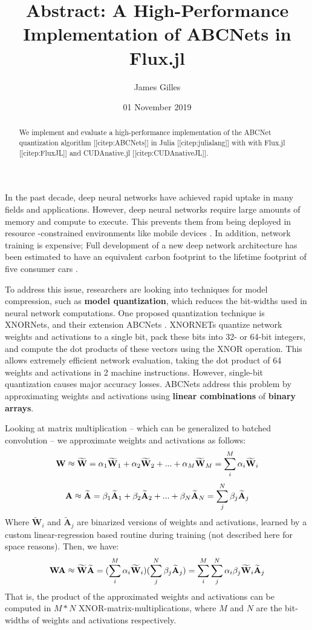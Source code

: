 \documentclass[11pt]{article}
\author{James Gilles}
\date{01 November 2019}
\title{Abstract: A High-Performance Implementation of ABCNets in Flux.jl}
\newcommand*{\Wv}[0]{\mathbf{W}}
\newcommand*{\Av}[0]{\mathbf{A}}
\newcommand*{\Wa}[0]{\widetilde{\mathbf{W}}}
\newcommand*{\Aa}[0]{\widetilde{\mathbf{A}}}
\newcommand*{\approxident}{%
\mathrel{\vcenter{\offinterlineskip
\hbox{$\sim$}\vskip-.35ex\hbox{$\sim$}}}}
\renewcommand*{\maketitle}[0]{}
\renewcommand*{\tableofcontents}[0]{}
\begin{document}
\maketitle
\tableofcontents

\begin{abstract}
We implement and evaluate a high-performance implementation of the ABCNet quantization algorithm [[citep:ABCNets]] in Julia [[citep:julialang]] with
with Flux.jl [[citep:FluxJL]] and CUDAnative.jl [[citep:CUDAnativeJL]].
\end{abstract}

In the past decade, deep neural networks have achieved rapid uptake in many fields
and applications. However, deep neural networks require large amounts
of memory and compute to execute. This prevents them from being deployed in resource
-constrained environments like mobile devices \citep{MobileNets}. In addition,
network training is expensive; Full
development of a new deep network architecture has been estimated to have an equivalent
carbon footprint to the lifetime footprint of five consumer cars \citep{EmitCarbon}.



To address this issue, researchers are looking into techniques for model compression,
such as \textbf{model quantization}, which reduces the bit-widths used in neural network
computations. One proposed quantization
technique is XNORNets, and their extension ABCNets \citep{XNORNets}\citep{ABCNets}.
XNORNETs quantize network weights and activations to a single
bit, pack these bits into 32- or 64-bit integers, and compute the dot products of
these vectors using the XNOR operation. This allows extremely efficient network
evaluation, taking the dot product of 64 weights and activations in 2
machine instructions. However, single-bit quantization causes major accuracy losses.
ABCNets address this problem by approximating weights and
activations using \textbf{linear combinations} of \textbf{binary arrays}.

Looking at matrix multiplication -- which can be generalized to batched convolution --
we approximate weights and activations as follows:
$$\Wv \approxident \Wa = \alpha_1 \Wa_1 + \alpha_2 \Wa_2 + ... + \alpha_M \Wa_M = \sum_i^M \alpha_i \Wa_i$$
$$\Av \approxident \Aa = \beta_1 \Aa_1 + \beta_2 \Aa_2 + ... + \beta_N \Aa_N = \sum_j^N \beta_j \Aa_j $$
Where \(\Wa_i\) and \(\Aa_j\) are binarized versions of weights and activations, learned by a
custom linear-regression based routine during training (not described here for space
reasons).
Then, we have:
$$\Wv\Av \approxident \Wa\Aa = (\sum_i^M \alpha_i \Wa_i) (\sum_j^N \beta_j \Aa_j) \\
                            = \sum_i^M \sum_j^N \alpha_i \beta_j \Wa_i \Aa_j$$
That is, the product of the approximated weights and activations can be
computed in \(M*N\) XNOR-matrix-multiplications, where \(M\) and \(N\) are the bit-widths of
weights and activations respectively.
\end{document}
